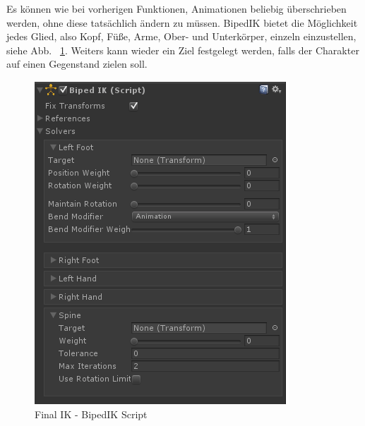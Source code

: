 Es können wie bei vorherigen Funktionen, Animationen beliebig überschrieben werden, ohne diese tatsächlich ändern zu müssen.
BipedIK bietet die Möglichkeit jedes Glied, also Kopf, Füße, Arme, Ober- und Unterkörper, einzeln einzustellen, siehe Abb. ~\ref{fig:finalIK_bipedik_script}.
Weiters kann wieder ein Ziel festgelegt werden, falls der Charakter auf einen Gegenstand zielen soll.
\begin {figure}
    \centering
    \includegraphics[scale=0.8]{pics/finalik_bipedik_script}
    \caption{Final IK - BipedIK Script}
    \label{fig:finalIK_bipedik_script}
\end {figure}
~\cite{FinalIK_BipedIK_2021}

